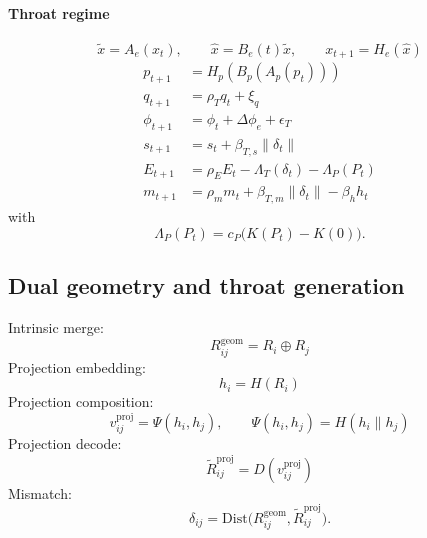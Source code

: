 \documentclass[11pt,a4paper]{article}
\begin{document}
\paragraph{Throat regime}
\begin{equation}
\widetilde{x}=A_e(x_t),\qquad \widehat{x}=B_e(t)\widetilde{x},\qquad x_{t+1}=H_e(\widehat{x})
\label{eq:throat_transfer}
\end{equation}
\begin{align}
p_{t+1}&=H_p(B_p(A_p(p_t)))
\label{eq:thr_pos}\\
q_{t+1}&=\rho_T q_t+\xi_q
\label{eq:thr_vel}\\
\phi_{t+1}&=\phi_t+\Delta\phi_e+\epsilon_T
\label{eq:thr_phase}\\
s_{t+1}&=s_t+\beta_{T,s}\|\delta_t\|
\label{eq:thr_stress}\\
E_{t+1}&=\rho_E E_t-\Lambda_T(\delta_t)-\Lambda_P(P_t)
\label{eq:thr_energy}\\
m_{t+1}&=\rho_m m_t+\beta_{T,m}\|\delta_t\|-\beta_h h_t
\label{eq:thr_mismatch}
\end{align}
with
\begin{equation}
\Lambda_P(P_t)=c_P\bigl(K(P_t)-K(0)\bigr).
\label{eq:pressure_penalty}
\end{equation}

\subsection{Dual geometry and throat generation}

Intrinsic merge:
\begin{equation}
R_{ij}^{\mathrm{geom}}=R_i\oplus R_j
\label{eq:intrinsic_merge}
\end{equation}
Projection embedding:
\begin{equation}
h_i=H(R_i)
\label{eq:hash_embed}
\end{equation}
Projection composition:
\begin{equation}
v_{ij}^{\mathrm{proj}}=\Psi(h_i,h_j),
\qquad
\Psi(h_i,h_j)=H(h_i\|h_j)
\label{eq:projection_comp}
\end{equation}
Projection decode:
\begin{equation}
\widetilde{R}_{ij}^{\mathrm{proj}}=D(v_{ij}^{\mathrm{proj}})
\label{eq:projection_decode}
\end{equation}
Mismatch:
\begin{equation}
\delta_{ij}=
\mathrm{Dist}\bigl(R_{ij}^{\mathrm{geom}},\widetilde{R}_{ij}^{\mathrm{proj}}\bigr).
\label{eq:projection_mismatch}
\end{equation}
\end{document}
